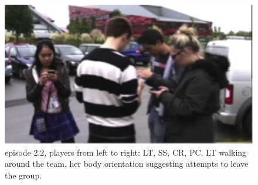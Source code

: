 \begin{figure}[ht]
 \includegraphics[width=1\textwidth]{img/study2/ep2/ep21}
\caption{episode 2.2, players from left to right: LT, SS, CR, PC. LT  walking around the team, her body orientation suggesting attempts to leave the group.}
\label{fig:study2ep21}
\end{figure}


